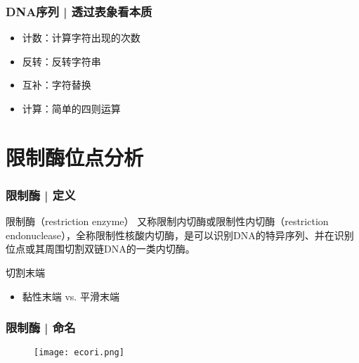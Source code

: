 \begin{frame}
  \frametitle{DNA序列 | 透过表象看本质}
  \begin{itemize}
    \item 计数：计算字符出现的次数
    \item 反转：反转字符串
    \item 互补：字符替换
    \item 计算：简单的四则运算
  \end{itemize}
\end{frame}

\section{限制酶位点分析}
\begin{frame}
  \frametitle{限制酶 | 定义}
  \begin{block}{限制酶（restriction enzyme）}
    又称限制内切酶或限制性内切酶（restriction endonuclease），全称限制性核酸内切酶，是可以识别DNA的特异序列、并在识别位点或其周围切割双链DNA的一类内切酶。
  \end{block}
  \pause
  \begin{block}{切割末端}
    \begin{itemize}
      \item 黏性末端 vs. 平滑末端
    \end{itemize}
  \end{block}
  \begin{figure}
    \centering
  \end{figure}
\end{frame}

\begin{frame}
  \frametitle{限制酶 | \alert{命名}}
  \begin{figure}
    \centering
    \texttt{[image: ecori.png]}
  \end{figure}
\end{frame}


